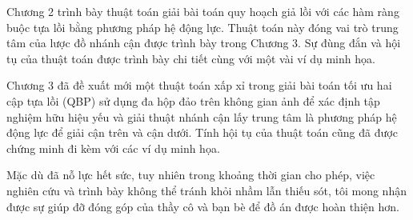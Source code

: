 \documentclass[oneside, a4paper]{book}
\theoremstyle{plain}
\theoremstyle{definition}
\theoremstyle{remark}
\begin{document}
Chương 2 trình bày  thuật toán giải bài toán quy hoạch giả lồi với các hàm ràng buộc tựa lồi bằng phương pháp hệ động lực. Thuật toán này đóng vai trò trung tâm của lược đồ nhánh cận được trình bày trong Chương 3. Sự đùng đắn và hội tụ của thuật toán được trình bày chi tiết cùng với một vài ví dụ minh họa.

Chương 3 đã đề xuất mới một thuật toán xấp xỉ trong giải bài toán tối ưu hai cập tựa lồi (QBP) sử dụng đa hộp đảo trên không gian ảnh để xác định tập nghiệm hữu hiệu yếu và giải thuật nhánh cận lấy trung tâm là phương pháp hệ động lực để giải cận trên và cận dưới. Tính hội tụ của thuật toán cũng đã được chứng minh đi kèm với các ví dụ minh họa.

Mặc dù đã nỗ lực hết sức, tuy nhiên trong khoảng thời gian cho phép,
việc nghiên cứu và trình bày không thể tránh khỏi nhầm lẫn thiếu sót,
tôi mong nhận được sự giúp đỡ đóng góp của thầy cô và bạn bè để đồ
án được hoàn thiện hơn.

\printbibliography[title={Danh mục tài liệu tham khảo}]
\end{document}
